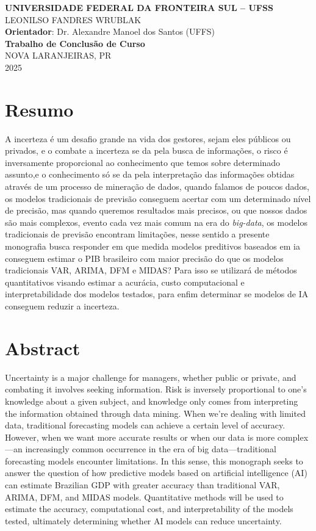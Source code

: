 \documentclass[12pt]{article}%
\begin{document}
	\begin{center}
		\thispagestyle{empty}
		\large
		\textbf{UNIVERSIDADE FEDERAL DA FRONTEIRA SUL -- UFSS}\\
		\vspace{7cm}
		LEONILSO FANDRES WRUBLAK\\
		\textbf{Orientador}: Dr. Alexandre Manoel dos Santos (UFFS)\\
		\vspace{3cm}
		\textbf{Trabalho de Conclusão de Curso}\\
		\vspace{5cm}
		NOVA LARANJEIRAS, PR\\
		2025
	\end{center}
	
	\section*{\centering Resumo}
	A incerteza é um desafio grande na vida dos gestores, sejam eles públicos ou privados, e o combate a incerteza se da pela busca de informações, o risco é inversamente proporcional ao conhecimento que temos sobre determinado assunto,e o conhecimento só se da pela interpretação das informações obtidas através de um processo de mineração de dados, quando falamos de poucos dados, os modelos tradicionais de previsão conseguem acertar com um determinado nível de precisão, mas quando queremos resultados mais precisos, ou que nossos dados são mais complexos, evento cada vez mais comum na era do \textit{big-data}, os modelos tradicionais de previsão encontram limitações, nesse sentido a presente monografia busca responder em que medida modelos preditivos baseados em \ac{ia} conseguem estimar o PIB brasileiro com maior precisão do que os modelos tradicionais VAR, ARIMA, DFM e MIDAS? Para isso se utilizará de métodos quantitativos visando estimar a acurácia, custo computacional e interpretabilidade dos modelos testados, para enfim determinar se modelos de IA conseguem reduzir a incerteza.
	

	\newpage
	\section*{\centering Abstract}
	Uncertainty is a major challenge for managers, whether public or private, and combating it involves seeking information. Risk is inversely proportional to one's knowledge about a given subject, and knowledge only comes from interpreting the information obtained through data mining. When we're dealing with limited data, traditional forecasting models can achieve a certain level of accuracy. However, when we want more accurate results or when our data is more complex—an increasingly common occurrence in the era of big data—traditional forecasting models encounter limitations. In this sense, this monograph seeks to answer the question of how predictive models based on artificial intelligence (AI) can estimate Brazilian GDP with greater accuracy than traditional VAR, ARIMA, DFM, and MIDAS models. Quantitative methods will be used to estimate the accuracy, computational cost, and interpretability of the models tested, ultimately determining whether AI models can reduce uncertainty.
	\newpage
\end{document}
